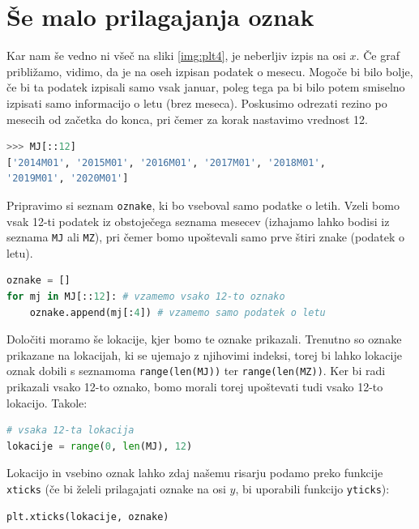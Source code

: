 \section{Še malo prilagajanja oznak}
Kar nam še vedno ni všeč na sliki \ref{img:plt4}, je neberljiv izpis na osi $x$. Če graf približamo, vidimo, da je na oseh izpisan podatek o mesecu. Mogoče bi bilo bolje, če bi ta podatek izpisali samo vsak januar, poleg tega pa bi bilo potem smiselno izpisati samo informacijo o letu (brez meseca). Poskusimo odrezati rezino po mesecih od začetka do konca, pri čemer za korak nastavimo vrednost 12.
\begin{lstlisting}[language=Python, showstringspaces=false]
>>> MJ[::12]
['2014M01', '2015M01', '2016M01', '2017M01', '2018M01',
'2019M01', '2020M01']
\end{lstlisting}
Pripravimo si seznam \texttt{oznake}, ki bo vseboval samo podatke o letih. Vzeli bomo vsak 12-ti podatek iz obstoječega seznama mesecev (izhajamo lahko bodisi iz seznama \texttt{MJ} ali \texttt{MZ}), pri čemer bomo upoštevali samo prve štiri znake (podatek o letu). 
\begin{lstlisting}[language=Python, showstringspaces=false]
oznake = []
for mj in MJ[::12]: # vzamemo vsako 12-to oznako
    oznake.append(mj[:4]) # vzamemo samo podatek o letu
\end{lstlisting}
Določiti moramo še lokacije, kjer bomo te oznake prikazali. Trenutno so oznake prikazane na lokacijah, ki se ujemajo z njihovimi indeksi, torej bi lahko lokacije oznak dobili s seznamoma \texttt{range(len(MJ))} ter \texttt{range(len(MZ))}. Ker bi radi prikazali vsako 12-to oznako, bomo morali torej upoštevati tudi vsako 12-to lokacijo. Takole:
\begin{lstlisting}[language=Python, showstringspaces=false]
# vsaka 12-ta lokacija
lokacije = range(0, len(MJ), 12) 
\end{lstlisting}

Lokacijo in vsebino oznak lahko zdaj našemu risarju podamo preko funkcije \texttt{xticks} (če bi želeli prilagajati oznake na osi $y$, bi uporabili funkcijo \texttt{yticks}):
\begin{lstlisting}[language=Python, showstringspaces=false]
plt.xticks(lokacije, oznake)
\end{lstlisting}

